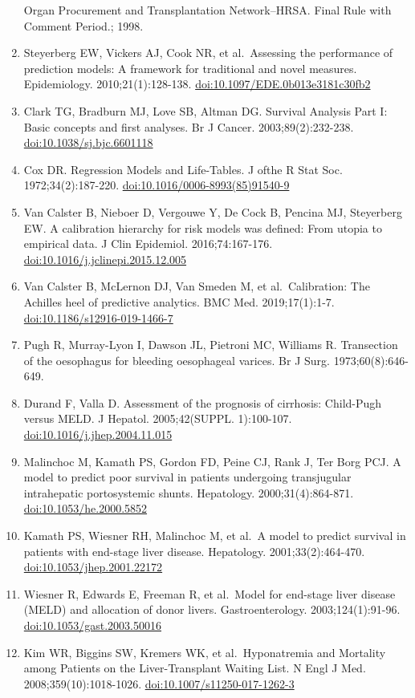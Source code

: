 \documentclass[11pt,english,]{book} %
\begin{document}
\begin{enumerate}
  Organ Procurement and Transplantation Network--HRSA. Final Rule with Comment Period.; 1998.
\item
  Steyerberg EW, Vickers AJ, Cook NR, et al.~Assessing the performance of prediction models: A framework for traditional and novel measures. Epidemiology. 2010;21(1):128-138. \url{doi:10.1097/EDE.0b013e3181c30fb2}
\item
  Clark TG, Bradburn MJ, Love SB, Altman DG. Survival Analysis Part I: Basic concepts and first analyses. Br J Cancer. 2003;89(2):232-238. \url{doi:10.1038/sj.bjc.6601118}
\item
  Cox DR. Regression Models and Life-Tables. J ofthe R Stat Soc. 1972;34(2):187-220. \url{doi:10.1016/0006-8993(85)91540-9}
\item
  Van Calster B, Nieboer D, Vergouwe Y, De Cock B, Pencina MJ, Steyerberg EW. A calibration hierarchy for risk models was defined: From utopia to empirical data. J Clin Epidemiol. 2016;74:167-176. \url{doi:10.1016/j.jclinepi.2015.12.005}
\item
  Van Calster B, McLernon DJ, Van Smeden M, et al.~Calibration: The Achilles heel of predictive analytics. BMC Med. 2019;17(1):1-7. \url{doi:10.1186/s12916-019-1466-7}
\item
  Pugh R, Murray-Lyon I, Dawson JL, Pietroni MC, Williams R. Transection of the oesophagus for bleeding oesophageal varices. Br J Surg. 1973;60(8):646-649.
\item
  Durand F, Valla D. Assessment of the prognosis of cirrhosis: Child-Pugh versus MELD. J Hepatol. 2005;42(SUPPL. 1):100-107. \url{doi:10.1016/j.jhep.2004.11.015}
\item
  Malinchoc M, Kamath PS, Gordon FD, Peine CJ, Rank J, Ter Borg PCJ. A model to predict poor survival in patients undergoing transjugular intrahepatic portosystemic shunts. Hepatology. 2000;31(4):864-871. \url{doi:10.1053/he.2000.5852}
\item
  Kamath PS, Wiesner RH, Malinchoc M, et al.~A model to predict survival in patients with end-stage liver disease. Hepatology. 2001;33(2):464-470. \url{doi:10.1053/jhep.2001.22172}
\item
  Wiesner R, Edwards E, Freeman R, et al.~Model for end-stage liver disease (MELD) and allocation of donor livers. Gastroenterology. 2003;124(1):91-96. \url{doi:10.1053/gast.2003.50016}
\item
  Kim WR, Biggins SW, Kremers WK, et al.~Hyponatremia and Mortality among Patients on the Liver-Transplant Waiting List. N Engl J Med. 2008;359(10):1018-1026. \url{doi:10.1007/s11250-017-1262-3}

\end{enumerate}
\end{document}
